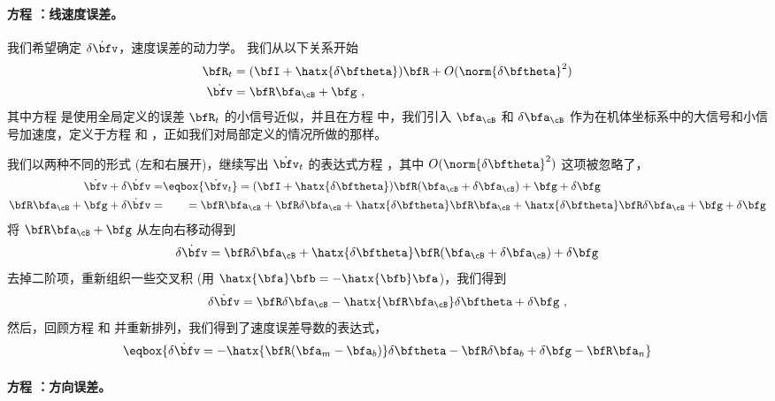 \paragraph{方程 ：线速度误差。}

我们希望确定 $\dot{\delta\bfv}$，速度误差的动力学。 
我们从以下关系开始
%
%
\begin{align}
\bfR_t &= (\bfI+\hatx{\delta\bftheta})\bfR  + O(\norm{\delta\bftheta}^2) \label{equ:Rtglobal}\\
\dot\bfv &= \bfR\bfa_\cB + \bfg~, \label{equ:vdot2global}
\end{align}%
%
其中方程  是使用全局定义的误差 $\bfR_t$ 的小信号近似，并且在方程  中，我们引入 $\bfa_\cB$ 和 $\delta\bfa_\cB$ 作为在机体坐标系中的大信号和小信号加速度，定义于方程  和 ，正如我们对局部定义的情况所做的那样。

我们以两种不同的形式 (左和右展开)，继续写出 $\dot\bfv_t$ 的表达式方程  ，其中 $O(\norm{\delta\bftheta}^2)$ 这项被忽略了，
%
%
\begin{align*}
\dot\bfv+\dot{\delta\bfv} =& \eqbox{\dot\bfv_t} = (\bfI + \hatx{\delta\bftheta})\bfR(\bfa_\cB+\delta\bfa_\cB) + \bfg + \delta\bfg \\
\bfR\bfa_\cB+\bfg+\dot{\delta\bfv} =&
~~~~~~= \bfR\bfa_\cB+\bfR\delta\bfa_\cB + \hatx{\delta\bftheta}\bfR\bfa_\cB + \hatx{\delta\bftheta}\bfR\delta\bfa_\cB + \bfg + \delta\bfg 
\end{align*}%
%
将 $\bfR\bfa_\cB+\bfg$ 从左向右移动得到
%
\begin{equation}
\dot{\delta\bfv} = \bfR\delta\bfa_\cB + \hatx{\delta\bftheta}\bfR(\bfa_\cB + \delta\bfa_\cB) + \delta\bfg
\end{equation}%
%
去掉二阶项，重新组织一些交叉积 (用 $\hatx{\bfa}\bfb=-\hatx{\bfb}\bfa$)，我们得到
%
\begin{equation}
\dot{\delta\bfv} = \bfR\delta\bfa_\cB - \hatx{\bfR\bfa_\cB}\delta\bftheta + \delta\bfg~,
\end{equation}%
%
然后，回顾方程  和  并重新排列，我们得到了速度误差导数的表达式，
%
\begin{equation}
\eqbox{{\dot{\delta\bfv} = -\hatx{\bfR(\bfa_m-\bfa_b)}\delta\bftheta - \bfR\delta\bfa_b + \delta\bfg - \bfR\bfa_n }}
\end{equation}%


\paragraph{方程 ：方向误差。}

